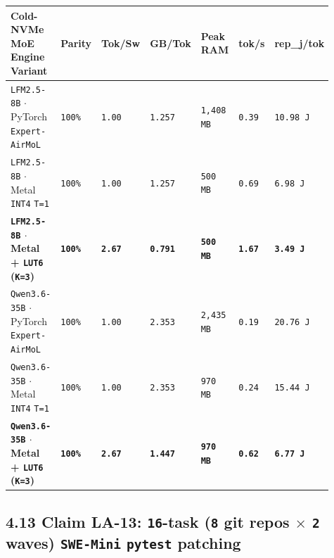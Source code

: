 \documentclass[10pt]{article}
\begin{document}
{\footnotesize\setlength{\tabcolsep}{2.8pt}
\begin{longtable}{@{}L{0.34\linewidth}C{0.07\linewidth}C{0.08\linewidth}C{0.10\linewidth}C{0.12\linewidth}C{0.09\linewidth}C{0.11\linewidth}@{}}
\toprule
\textbf{Cold-NVMe MoE Engine Variant} & \textbf{Parity} & \textbf{Tok/Sw} & \textbf{GB/Tok} & \textbf{Peak RAM} & \textbf{tok/s} & \textbf{rep\_j/tok} \\
\midrule
\endhead
\texttt{LFM2.5-8B} $\cdot$ PyTorch \texttt{Expert-AirMoL} & \texttt{100\%} & \texttt{1.00} & \texttt{1.257} & \texttt{1,408 MB} & \texttt{0.39} & \texttt{10.98 J} \\
\texttt{LFM2.5-8B} $\cdot$ Metal \texttt{INT4} \texttt{T=1} & \texttt{100\%} & \texttt{1.00} & \texttt{1.257} & \texttt{500 MB} & \texttt{0.69} & \texttt{6.98 J} \\
\textbf{\texttt{LFM2.5-8B} $\cdot$ Metal + \texttt{LUT6} (\texttt{K=3})} & \textbf{\texttt{100\%}} & \textbf{\texttt{2.67}} & \textbf{\texttt{0.791}} & \textbf{\texttt{500 MB}} & \textbf{\texttt{1.67}} & \textbf{\texttt{3.49 J}} \\
\midrule
\texttt{Qwen3.6-35B} $\cdot$ PyTorch \texttt{Expert-AirMoL} & \texttt{100\%} & \texttt{1.00} & \texttt{2.353} & \texttt{2,435 MB} & \texttt{0.19} & \texttt{20.76 J} \\
\texttt{Qwen3.6-35B} $\cdot$ Metal \texttt{INT4} \texttt{T=1} & \texttt{100\%} & \texttt{1.00} & \texttt{2.353} & \texttt{970 MB} & \texttt{0.24} & \texttt{15.44 J} \\
\textbf{\texttt{Qwen3.6-35B} $\cdot$ Metal + \texttt{LUT6} (\texttt{K=3})} & \textbf{\texttt{100\%}} & \textbf{\texttt{2.67}} & \textbf{\texttt{1.447}} & \textbf{\texttt{970 MB}} & \textbf{\texttt{0.62}} & \textbf{\texttt{6.77 J}} \\
\bottomrule
\end{longtable}
}

\subsection{4.13 Claim LA-13: \texttt{16}-task (\texttt{8} git repos \texorpdfstring{$\times$}{x} \texttt{2} waves) \texttt{SWE-Mini} \texttt{pytest} patching}\label{claim-la13}
\end{document}

